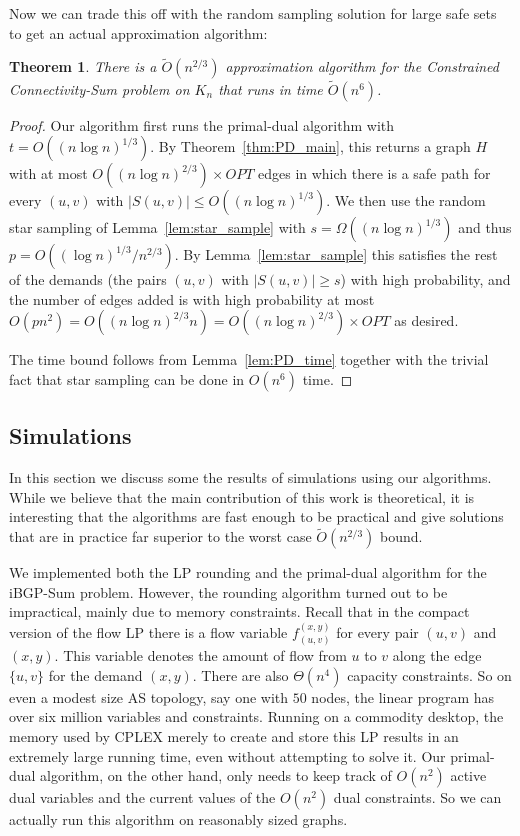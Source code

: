 \documentclass[11pt,letterpaper]{article}
\newtheorem{theorem}{Theorem}[section]
\theoremstyle{definition}
\newcounter{note}[section]
\begin{document}
Now we can trade this off with the random sampling solution for large
safe sets to get an actual approximation algorithm:

\begin{theorem} \label{thm:PD_total}
  There is a $\tilde{O}(n^{2/3})$ approximation algorithm for the
  {\sc Constrained Connectivity-Sum} problem on $K_n$ that runs in time $\tilde{O}(n^6)$.
\end{theorem}
\begin{proof}
Our algorithm first runs the primal-dual algorithm with $t = O((n \log n)^{1/3})$.  By Theorem~\ref{thm:PD_main}, this returns a graph $H$ with at most $O((n \log n)^{2/3}) \times OPT$ edges in which there is a safe path for every $(u,v)$ with $|S(u,v)| \leq O((n \log n)^{1/3})$.  We then use the random star sampling of Lemma~\ref{lem:star_sample} with $s = \Omega((n \log n)^{1/3})$ and thus $p = O((\log n)^{1/3} / n^{2/3})$.  By Lemma~\ref{lem:star_sample} this satisfies the rest of the demands (the pairs $(u,v)$ with $|S(u,v)| \geq s$) with high probability, and the number of edges added is with high probability at most $O(p n^2) = O((n \log n)^{2/3} n) = O((n \log n)^{2/3}) \times OPT$ as desired.

The time bound follows from Lemma~\ref{lem:PD_time} together with the trivial fact that star sampling can be done in $O(n^6)$ time.
\end{proof}


\subsection{Simulations} \label{sec:Simulations}

In this section we discuss some the results of simulations using our
algorithms.  While we believe that the main contribution of this work
is theoretical, it is interesting that the algorithms are fast enough
to be practical and give solutions that are in practice far superior
to the worst case $\tilde{O}(n^{2/3})$ bound.

We implemented both the LP rounding and the primal-dual algorithm for
the {\sc iBGP-Sum} problem.  However, the rounding algorithm turned
out to be impractical, mainly due to memory constraints.  Recall that
in the compact version of the flow LP there is a flow variable
$f_{(u,v)}^{(x,y)}$ for every pair $(u,v)$ and $(x,y)$.  This variable
denotes the amount of flow from $u$ to $v$ along the edge $\{u,v\}$ for
the demand $(x,y)$.  There are also $\Theta(n^4)$ capacity
constraints.  So on even a modest size AS topology, say one with $50$
nodes, the linear program has over six million variables and
constraints.  Running on a commodity desktop, the memory used by CPLEX
merely to create and store this LP results in an extremely large
running time, even without attempting to solve it.  Our primal-dual
algorithm, on the other hand, only needs to keep track of $O(n^2)$
active dual variables and the current values of the $O(n^2)$ dual
constraints.  So we can actually run this algorithm on reasonably
sized graphs.
\end{document}
